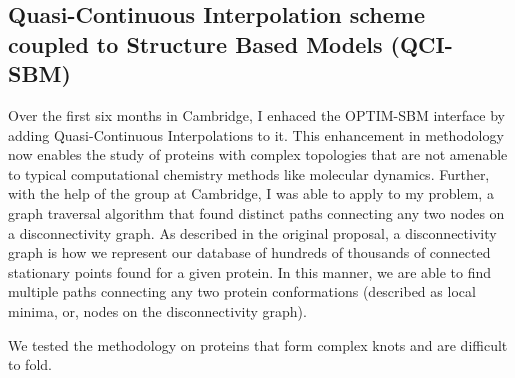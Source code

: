 \documentclass[a4paper,11pt]{article}
\begin{document}
\subsection{Quasi-Continuous Interpolation scheme coupled to Structure Based Models (QCI-SBM)} 
Over the first six months in Cambridge, I enhaced the OPTIM-SBM interface by adding Quasi-Continuous Interpolations to it. This enhancement in methodology now enables the study of proteins with complex topologies that are not amenable to typical computational chemistry methods like molecular dynamics. Further, with the help of the group at Cambridge, I was able to apply to my problem, a graph traversal algorithm that found distinct paths connecting any two nodes on a disconnectivity graph. As described in the original proposal, a disconnectivity graph is how we represent our database of hundreds of thousands of connected stationary points found for a given protein. In this manner, we are able to find multiple paths connecting any two protein conformations (described as local minima, or, nodes on the disconnectivity graph). 

We tested the methodology on proteins that form complex knots and are difficult to fold.
\end{document}
